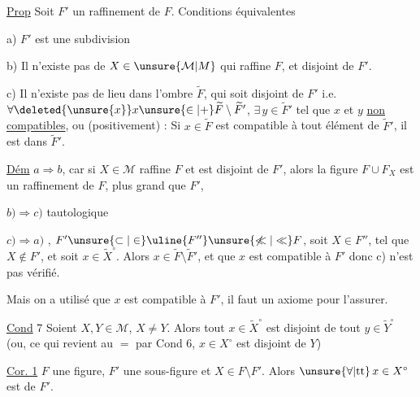 \uline{Prop} Soit $F'$ un raffinement de $F$. Conditions équivalentes

a) $F'$ est une subdivision

b) Il n'existe pas de $X\in\unsure{\mathcal M|M}$ qui raffine $F$, et disjoint de $F'$.

c)  Il n'existe pas de lieu dans l'ombre $\widetilde F$, qui soit disjoint de $F'$ i.e.  $\forall\deleted{\unsure{x}}x\unsure{\in|+}\widetilde F\setminus\widetilde F'$, $\exists\,y\in\widetilde F'$ tel que $x$ et $y$ \uline{non compatibles}, ou (positivement) : Si $x\in\widetilde F$ est compatible à tout élément de $\widetilde F'$, il est dans $\widetilde F'$.

\uline{Dém} $a\Longrightarrow b$, car si $X\in\mathcal M$ raffine $F$ et est disjoint de $F'$, alors la figure $F\cup F_X$ est un raffinement de $F$,  plus grand que $F'$,

$b)\Longrightarrow c)$ tautologique

$c)\Longrightarrow a)$  , $F'\unsure{\subset|\in} \uline{F''}\unsure{\not\ll|\ll}F$, soit $X\in F''$, tel que $X\notin F'$, et soit $x\in\widetilde X^\circ$. Alors $x\in\widetilde F\setminus\widetilde F'$, et  que $x$ est compatible à $F'$ donc c) n'est pas vérifié.

Mais on a utilisé que $x$ est compatible à $F'$, il faut un axiome pour l'assurer.

\uline{Cond} 7 Soient $X,Y\in\mathcal M$,  $X\ne Y$.  Alors tout $x\in\widetilde X^\circ$ est disjoint de tout $y\in\widetilde Y^\circ$ (ou, ce qui revient au $=$ par Cond 6,  $x\in X^\circ$ est disjoint de $Y$)

\uline{Cor. 1}  $F$ une figure, $F'$ une sous-figure et $X\in F\setminus F'$. Alors $\unsure{\forall|\mathrm{tt}}\,x\in X^\circ$ est   de $F'$.
